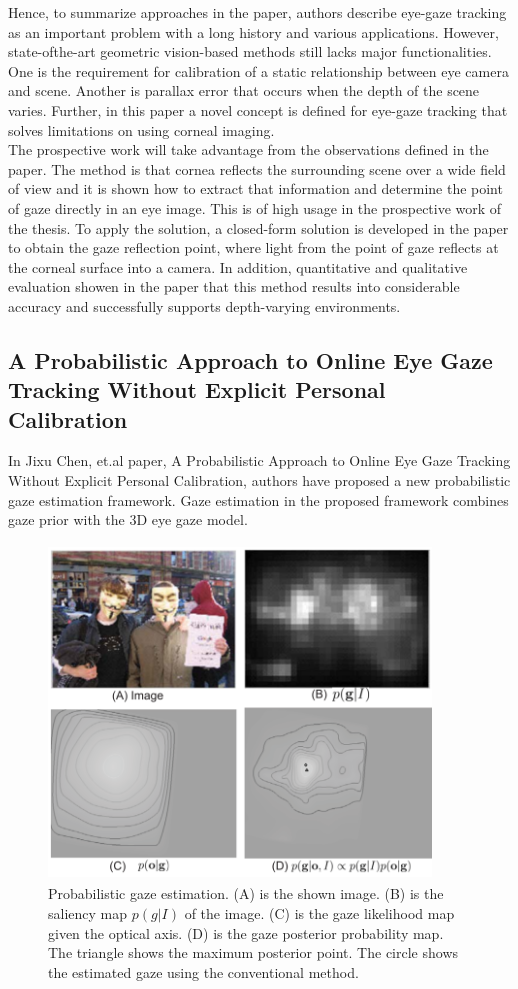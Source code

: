 Hence, to summarize approaches in the paper, authors describe eye-gaze tracking as an important problem with a long history and various applications. However, state-ofthe-art geometric vision-based methods still lacks major functionalities. One is the requirement for calibration of a static relationship between eye camera and scene. Another is parallax error that occurs when the depth of the scene varies. Further, in this paper a novel concept is defined for eye-gaze tracking that solves limitations on using corneal imaging.\\

The prospective work will take advantage from the observations defined in the paper. The method is that cornea reflects the surrounding scene over a wide field of view and it is shown how to extract that information and determine the point of gaze directly in an eye image. This is of high usage in the prospective work of the thesis. To apply the solution, a closed-form solution is developed in the paper to obtain the gaze reflection point, where light from the point of gaze reflects at the corneal surface into a camera. In addition, quantitative and qualitative evaluation showen in the paper that this method results into considerable accuracy and successfully supports depth-varying environments.

\subsection{A Probabilistic Approach to Online Eye Gaze Tracking Without Explicit Personal Calibration}

In Jixu Chen, et.al \cite{21} paper, A Probabilistic Approach to Online Eye Gaze Tracking Without Explicit Personal Calibration, authors have proposed a new probabilistic gaze estimation framework. Gaze estimation in the proposed framework combines gaze prior with the 3D eye gaze model.

\begin{figure}[!hbt]
  \centering
  \includegraphics[width=4in,height=3.5in]{jixu.png}
  \caption{Probabilistic gaze estimation. (A) is the shown image. (B) is the saliency map $p(g|I)$ of the image. (C) is the gaze likelihood map given the optical axis. (D) is the gaze posterior probability map. The triangle shows the maximum posterior point. The circle shows the estimated gaze using the conventional method.}
  \label{jixu}
\end{figure}


